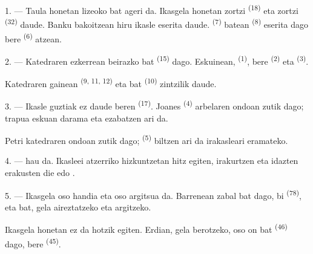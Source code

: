 \VUsaut{2.0mm}
\VUsaut{3.2mm}
\VUsaut{2.6mm}
\VUsaut{3.4mm}
\VUornamento{9pt}
\VUsaut{5.0mm}
\VUsaut{3.0mm}
\VUfilet{16mm}
\VUsaut{5.6mm}

\VUsaut{1.4mm}
\VUsaut{2.2mm}
\VUfilet{20mm}
\VUsaut{6.4mm}

\VUsaut{3.0mm}

1. --- Taula honetan lizeoko  bat ageri da. Ikasgela honetan
zortzi  \textsuperscript{(18)} eta zortzi 
\textsuperscript{(32)} daude. Banku bakoitzean hiru ikasle eserita daude.
 \textsuperscript{(7)}  batean
\textsuperscript{(8)} eserita dago bere  \textsuperscript{(6)}
atzean.

2. --- Katedraren ezkerrean beirazko  bat \textsuperscript{(15)}
dago. Eskuinean,  \textsuperscript{(1)}, bere 
\textsuperscript{(2)} eta  \textsuperscript{(3)}.

Katedraren gainean  \textsuperscript{(9, 11, 12)} eta
 bat \textsuperscript{(10)} zintzilik daude.

3. --- Ikasle guztiak ez daude beren  \textsuperscript{(17)}.
Joanes \textsuperscript{(4)} arbelaren ondoan zutik dago; trapua eskuan darama eta
 ezabatzen ari da.

Petri katedraren ondoan zutik dago;  \textsuperscript{(5)}
biltzen ari da irakasleari eramateko.

4. ---  hau  da. Ikasleei
atzerriko hizkuntzetan hitz egiten, irakurtzen eta idazten erakusten die
 edo
.

5. --- Ikasgela oso handia eta oso argitsua da. Barrenean  zabal
bat dago, bi  \textsuperscript{(78)}, eta  bat, gela aireztatzeko eta argitzeko.

Ikasgela honetan ez da hotzik egiten. Erdian, gela berotzeko, 
oso on bat \textsuperscript{(46)} dago, bere 
\textsuperscript{(45)}.


